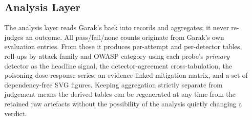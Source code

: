\subsection{Analysis Layer}
\label{sec:arch:analysis}

The analysis layer reads Garak's  back into records
and aggregates; it never re-judges an outcome. All pass/fail/none counts
originate from Garak's own evaluation entries. From those it produces
per-attempt and per-detector tables, roll-ups by attack family and OWASP
category using each probe's \emph{primary} detector as the headline
signal, the detector-agreement cross-tabulation, the poisoning
dose-response series, an evidence-linked mitigation matrix, and a set of
dependency-free SVG figures. Keeping aggregation strictly separate from
judgement means the derived tables can be regenerated at any time from
the retained raw artefacts without the possibility of the analysis
quietly changing a verdict.
